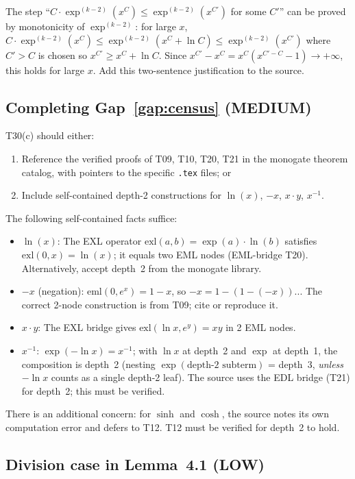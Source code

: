 \documentclass[12pt,a4paper]{article}
\theoremstyle{definition}
\theoremstyle{remark}
\begin{document}
The step ``$C\cdot\exp^{(k-2)}(x^C)\leq\exp^{(k-2)}(x^{C'})$ for some $C'$''
can be proved by monotonicity of $\exp^{(k-2)}$:
for large $x$, $C\cdot\exp^{(k-2)}(x^C)\leq\exp^{(k-2)}(x^C+\ln C)
\leq\exp^{(k-2)}(x^{C'})$ where $C'>C$ is chosen so $x^{C'}\geq x^C+\ln C$.
Since $x^{C'}-x^C=x^C(x^{C'-C}-1)\to+\infty$, this holds for large $x$.
Add this two-sentence justification to the source.

\subsection{Completing Gap~\ref{gap:census} (MEDIUM)}

T30(c) should either:
\begin{enumerate}
  \item Reference the verified proofs of T09, T10, T20, T21 in the monogate
        theorem catalog, with pointers to the specific \texttt{.tex} files; or
  \item Include self-contained depth-2 constructions for $\ln(x)$, $-x$,
        $x\cdot y$, $x^{-1}$.
\end{enumerate}

The following self-contained facts suffice:
\begin{itemize}
  \item $\ln(x)$: The EXL operator $\mathrm{exl}(a,b)=\exp(a)\cdot\ln(b)$ satisfies
        $\mathrm{exl}(0,x)=\ln(x)$; it equals two EML nodes (EML-bridge T20).
        Alternatively, accept depth~2 from the monogate library.
  \item $-x$ (negation): $\mathrm{eml}(0,e^x)=1-x$, so $-x=1-(1-(-x))$...
        The correct 2-node construction is from T09; cite or reproduce it.
  \item $x\cdot y$: The EXL bridge gives $\mathrm{exl}(\ln x,e^y)=xy$ in 2 EML nodes.
  \item $x^{-1}$: $\exp(-\ln x)=x^{-1}$; with $\ln x$ at depth~2 and $\exp$ at
        depth~1, the composition is depth~2 (nesting $\exp(\text{depth-2 subterm})$
        = depth~3, \emph{unless} $-\ln x$ counts as a single depth-2 leaf). The
        source uses the EDL bridge (T21) for depth~2; this must be verified.
\end{itemize}

There is an additional concern: for $\sinh$ and $\cosh$, the source notes its
own computation error and defers to T12.  T12 must be verified for depth~2 to hold.

\subsection{Division case in Lemma~4.1 (LOW)}
\end{document}
